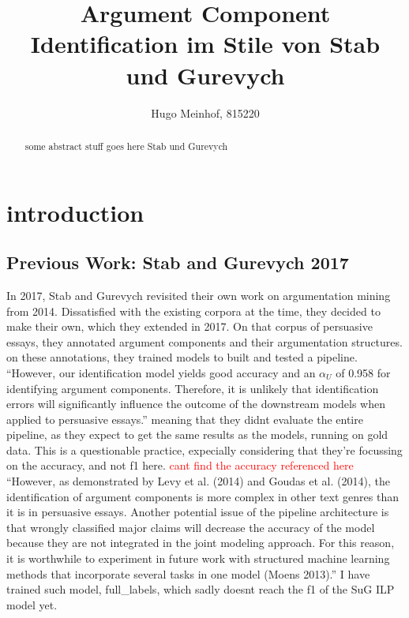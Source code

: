 \documentclass[12]{article}
\title{Argument Component Identification im Stile von Stab und Gurevych}
\author{Hugo Meinhof, 815220}
\theoremstyle{mytheoremstyle}
\theoremstyle{mytheoremstyle}
\theoremstyle{myproblemstyle}
\begin{document}
  \maketitle
  \begin{abstract}
  some abstract stuff goes here Stab und Gurevych\cite{stab-gurevych-2017-parsing}
  \end{abstract}
  \section{introduction\dotfill}
  \subsection{Previous Work: Stab and Gurevych 2017}
  In 2017, Stab and Gurevych\cite{stab-gurevych-2017-parsing} revisited their own work on argumentation mining from 2014. Dissatisfied with the existing corpora at the time, they decided to make their own, which they extended in 2017. On that corpus of persuasive essays, they annotated argument components and their argumentation structures. on these annotations, they trained models to built and tested a pipeline. 
  ``However, our identification model yields good accuracy and an $\alpha_U$ of 0.958 for identifying argument components. Therefore, it is unlikely that identification errors will significantly influence the outcome of the downstream models when applied to persuasive essays.'' meaning that they didnt evaluate the entire pipeline, as they expect to get the same results as the models, running on gold data. This is a questionable practice, expecially considering that they're focussing on the accuracy, and not f1 here. \textcolor{red}{cant find the accuracy referenced here}
  ``However, as demonstrated by Levy et al. (2014) and Goudas et al.
(2014), the identification of argument components is more complex in other text genres
than it is in persuasive essays. Another potential issue of the pipeline architecture is that
wrongly classified major claims will decrease the accuracy of the model because they
are not integrated in the joint modeling approach. For this reason, it is worthwhile to
experiment in future work with structured machine learning methods that incorporate
several tasks in one model (Moens 2013).'' I have trained such model, full\_labels, which sadly doesnt reach the f1 of the SuG ILP model yet.
\end{document}
